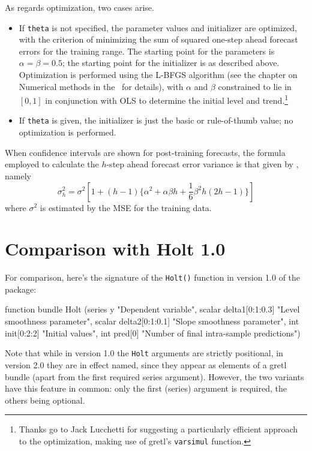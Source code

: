 \documentclass{article}
\begin{document}
As regards optimization, two cases arise.
\begin{itemize}
\item If \texttt{theta} is not specified, the parameter values and
  initializer are optimized, with the criterion of minimizing the sum of
  squared one-step ahead forecast errors for the training range. The
  starting point for the parameters is $\alpha = \beta = 0.5$; the
  starting point for the initializer is as described above. Optimization
  is performed using the L-BFGS algorithm (see the chapter on Numerical
  methods in the \GUG\ for details), with $\alpha$ and $\beta$
  constrained to lie in $[0,1]$ in conjunction with OLS to determine the
  initial level and trend.\footnote{Thanks go to Jack Lucchetti for
    suggesting a particularly efficient approach to the optimization,
    making use of gretl's \texttt{varsimul} function.}
\item If \texttt{theta} is given, the initializer is just the basic or
  rule-of-thumb value; no optimization is performed.
\end{itemize}

When confidence intervals are shown for post-training forecasts, the
formula employed to calculate the $h$-step ahead forecast error variance
is that given by \citet[section 8.7]{hyndman2021}, namely
\[
  \sigma^2_h = \sigma^2 \left[ 1 + (h-1) \{\alpha^2 + \alpha\beta h
        + \frac{1}{6} \beta^2h(2h-1) \} \right]
\]
where $\sigma^2$ is estimated by the MSE for the training data.

\section{Comparison with Holt 1.0}
\label{sec:update}

For comparison, here's the signature of the \texttt{Holt()} function in
version 1.0 of the package:
\begin{code}
function bundle Holt (series y "Dependent variable",
  scalar delta1[0:1:0.3] "Level smoothness parameter",
  scalar delta2[0:1:0.1] "Slope smoothness parameter",
  int init[0:2:2] "Initial values",
  int pred[0] "Number of final intra-sample predictions")
\end{code}
Note that while in version 1.0 the \texttt{Holt} arguments are strictly
positional, in version 2.0 they are in effect named, since they appear
as elements of a gretl bundle (apart from the first required series
argument). However, the two variants have this feature in common: only
the first (series) argument is required, the others being optional.
\end{document}
